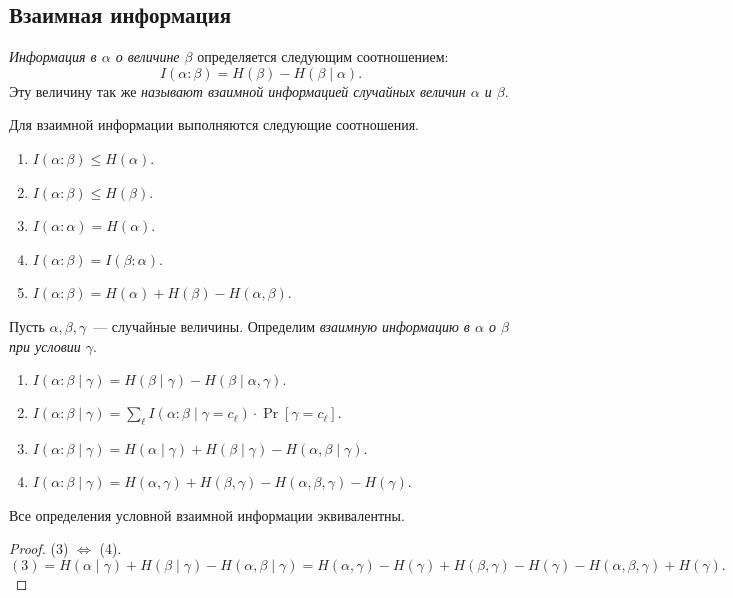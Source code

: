 \documentclass[12pt]{article}
\begin{document}
\subsection{Взаимная информация}
\begin{definition}
\emph{Информация в \(\alpha\) о величине \(\beta\)} определяется следующим соотношением:
\[
    I(\alpha:\beta) = H(\beta) - H(\beta\mid\alpha).
\]
Эту величину так же \emph{называют взаимной информацией случайных величин \(\alpha\) и \(\beta\)}.
\end{definition}
\begin{lemma}
Для взаимной информации выполняются следующие соотношения.
\begin{enumerate}
\item \(I(\alpha:\beta) \le H(\alpha) \).
\item \(I(\alpha:\beta) \le H(\beta) \).
\item \(I(\alpha:\alpha) = H(\alpha) \).
\item \(I(\alpha:\beta) = I(\beta:\alpha) \).
\item \(I(\alpha:\beta) = H(\alpha) + H(\beta) - H(\alpha,\beta) \).
\end{enumerate}
\end{lemma}
\begin{definition}
    Пусть \(\alpha,\beta,\gamma\)~--- случайные величины. Определим
    \emph{взаимную информацию в \(\alpha\) о \(\beta\) при условии \(\gamma\)}.
    \begin{enumerate}
        \item \(I(\alpha:\beta\mid\gamma) = H(\beta\mid\gamma) -
            H(\beta\mid\alpha,\gamma).\)
        \item \(I(\alpha:\beta\mid\gamma) = \sum_\ell I(\alpha:\beta \mid
            \gamma=c_\ell)\cdot \Pr[\gamma = c_\ell].\)
        \item \(I(\alpha:\beta\mid\gamma) = H(\alpha\mid\gamma) + H(\beta\mid\gamma) -
            H(\alpha,\beta\mid\gamma).\)
        \item \(I(\alpha:\beta\mid\gamma) = H(\alpha,\gamma) + H(\beta,\gamma) -
            H(\alpha,\beta,\gamma) - H(\gamma)\).
    \end{enumerate}
\end{definition}
\begin{lemma} 
    Все определения условной взаимной информации эквивалентны.
\end{lemma}
\begin{proof}
    (3) \(\iff\) (4).
    \[
    (3) = H(\alpha\mid\gamma) + H(\beta\mid\gamma) - H(\alpha,\beta\mid\gamma) =
    H(\alpha,\gamma) - H(\gamma) + H(\beta,\gamma) - H(\gamma) -
    H(\alpha,\beta,\gamma) + H(\gamma).
    \]

\end{proof}
\end{document}
